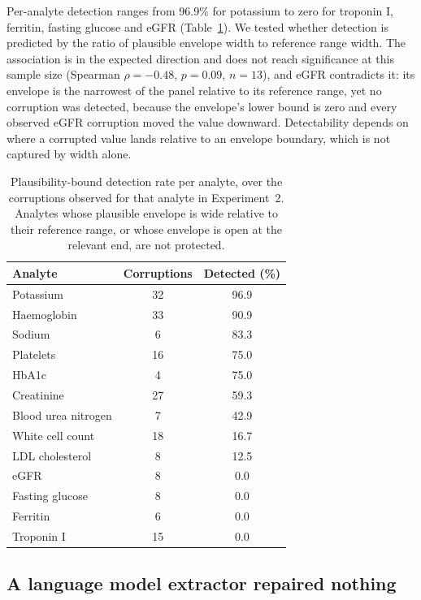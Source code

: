 \documentclass[11pt]{article}
\begin{document}
Per-analyte detection ranges from 96.9\% for potassium to zero for troponin I,
ferritin, fasting glucose and eGFR (Table~\ref{tab:peranalyte}). We tested whether detection is
predicted by the ratio of plausible envelope width to reference range width. The association is
in the expected direction and does not reach significance at this sample size
(Spearman $\rho = -0.48$, $p = 0.09$, $n = 13$), and eGFR contradicts it: its envelope is the
narrowest of the panel relative to its reference range, yet no corruption was detected, because
the envelope's lower bound is zero and every observed eGFR corruption moved the value downward.
Detectability depends on where a corrupted value lands relative to an envelope boundary, which
is not captured by width alone.

\begin{table}[t]
\centering
\caption{Plausibility-bound detection rate per analyte, over the corruptions observed for that
analyte in Experiment~2. Analytes whose plausible envelope is wide relative to their reference
range, or whose envelope is open at the relevant end, are not protected.}
\label{tab:peranalyte}
\small
\begin{tabular}{lcc}
\toprule
Analyte & Corruptions & Detected (\%) \\
\midrule
Potassium          & 32 & 96.9 \\
Haemoglobin        & 33 & 90.9 \\
Sodium             & \phantom{0}6 & 83.3 \\
Platelets          & 16 & 75.0 \\
HbA1c              & \phantom{0}4 & 75.0 \\
Creatinine         & 27 & 59.3 \\
Blood urea nitrogen & \phantom{0}7 & 42.9 \\
White cell count   & 18 & 16.7 \\
LDL cholesterol    & \phantom{0}8 & 12.5 \\
eGFR               & \phantom{0}8 & \phantom{0}0.0 \\
Fasting glucose    & \phantom{0}8 & \phantom{0}0.0 \\
Ferritin           & \phantom{0}6 & \phantom{0}0.0 \\
Troponin I         & 15 & \phantom{0}0.0 \\
\bottomrule
\end{tabular}
\end{table}

\subsection{A language model extractor repaired nothing}
\label{sec:llm-extractor}
\end{document}
